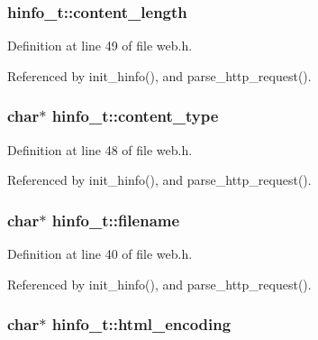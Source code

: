 \subsubsection[{\texorpdfstring{content\+\_\+length}{content_length}}]{ hinfo\+\_\+t\+::content\+\_\+length}\hypertarget{structhinfo__t_a6cf5714c0fe8e8e7f7819194274f9052}{}\label{structhinfo__t_a6cf5714c0fe8e8e7f7819194274f9052}


Definition at line 49 of file web.\+h.



Referenced by init\+\_\+hinfo(), and parse\+\_\+http\+\_\+request().

\subsubsection[{\texorpdfstring{content\+\_\+type}{content_type}}]{\setlength{\rightskip}{0pt plus 5cm}char$\ast$ hinfo\+\_\+t\+::content\+\_\+type}\hypertarget{structhinfo__t_a87bad5ce6af7ed3613a61d01aef94d8d}{}\label{structhinfo__t_a87bad5ce6af7ed3613a61d01aef94d8d}


Definition at line 48 of file web.\+h.



Referenced by init\+\_\+hinfo(), and parse\+\_\+http\+\_\+request().

\subsubsection[{\texorpdfstring{filename}{filename}}]{\setlength{\rightskip}{0pt plus 5cm}char$\ast$ hinfo\+\_\+t\+::filename}\hypertarget{structhinfo__t_a874ffdf5ade4e3844d7719444495e89c}{}\label{structhinfo__t_a874ffdf5ade4e3844d7719444495e89c}


Definition at line 40 of file web.\+h.



Referenced by init\+\_\+hinfo(), and parse\+\_\+http\+\_\+request().

\subsubsection[{\texorpdfstring{html\+\_\+encoding}{html_encoding}}]{\setlength{\rightskip}{0pt plus 5cm}char$\ast$ hinfo\+\_\+t\+::html\+\_\+encoding}\hypertarget{structhinfo__t_ac03bcdde52e49a14bf9112f295f216b5}{}\label{structhinfo__t_ac03bcdde52e49a14bf9112f295f216b5}


